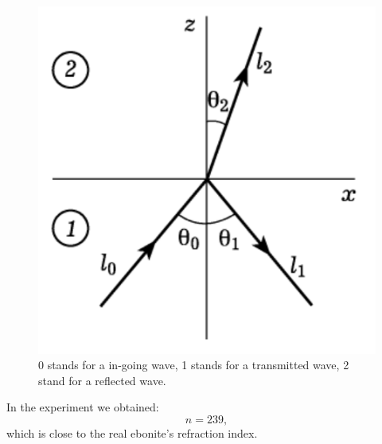 \begin{minipage}{0.35\textwidth}
    \begin{figure}[h]
    \centering
    \includegraphics[width=1\textwidth]{images/brust.png}
    \caption{0 stands for a in-going wave, 1 stands for a transmitted wave, 2 stand for a reflected wave.}
\end{figure}
\end{minipage}
\hfill
\begin{minipage}{0.55\textwidth}
	 In the experiment we obtained:
	 \begin{equation*}
	 	n = 239,
	 \end{equation*}
	 which is close to the real ebonite's refraction index.
\end{minipage}

